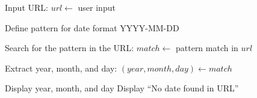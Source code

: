 \begin{algorithm}
\caption{Extract Date (YYYY-MM-DD) from a URL}
\begin{algorithmic}[1]

\STATE Input URL:
\STATE $url \gets$ user input

\STATE Define pattern for date format YYYY-MM-DD

\STATE Search for the pattern in the URL:
\STATE $match \gets$ pattern match in $url$

    \STATE Extract year, month, and day:
    \STATE $(year, month, day) \gets match$
    
    \STATE Display year, month, and day
\ELSE
    \STATE Display ``No date found in URL''
\ENDIF

\end{algorithmic}
\end{algorithm}